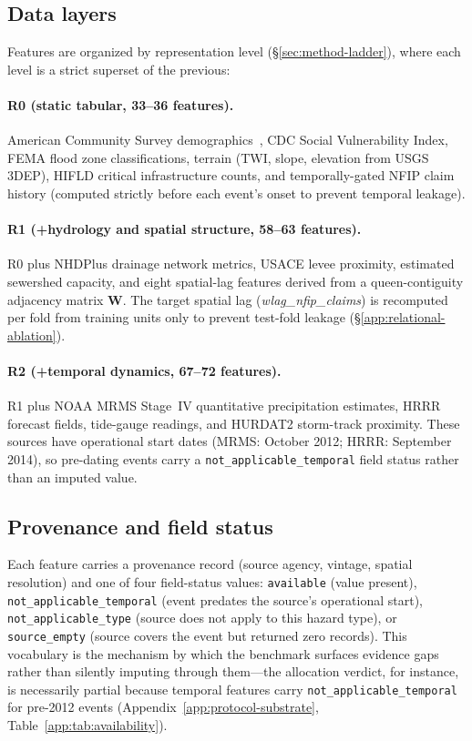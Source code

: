 \subsection{Data layers}

Features are organized by representation level
(\S\ref{sec:method-ladder}), where each level is a strict superset of
the previous:

\paragraph{R0 (static tabular, 33--36 features).}
American Community Survey demographics~\cite{kwon2023acs}, CDC Social
Vulnerability Index, FEMA flood zone classifications, terrain (TWI,
slope, elevation from USGS 3DEP), HIFLD critical infrastructure counts,
and temporally-gated NFIP claim history (computed strictly before each
event's onset to prevent temporal leakage).

\paragraph{R1 (+hydrology and spatial structure, 58--63 features).}
R0 plus NHDPlus drainage network metrics, USACE levee proximity, estimated
sewershed capacity, and eight spatial-lag features derived from a
queen-contiguity adjacency matrix $\mathbf{W}$. The target spatial lag
(\textit{wlag\_nfip\_claims}) is recomputed per fold from training units
only to prevent test-fold leakage (\S\ref{app:relational-ablation}).

\paragraph{R2 (+temporal dynamics, 67--72 features).}
R1 plus NOAA MRMS Stage~IV quantitative precipitation estimates, HRRR
forecast fields, tide-gauge readings, and HURDAT2 storm-track proximity.
These sources have operational start dates (MRMS: October 2012; HRRR:
September 2014), so pre-dating events carry a
\texttt{not\_applicable\_temporal} field status rather than an imputed
value.

\subsection{Provenance and field status}

Each feature carries a provenance record (source agency, vintage,
spatial resolution) and one of four field-status values:
\texttt{available} (value present), \texttt{not\_applicable\_temporal}
(event predates the source's operational start),
\texttt{not\_applicable\_type} (source does not apply to this hazard
type), or \texttt{source\_empty} (source covers the event but returned
zero records). This vocabulary is the mechanism by which the benchmark
surfaces evidence gaps rather than silently imputing through them---the
allocation verdict, for instance, is necessarily partial because
temporal features carry \texttt{not\_applicable\_temporal} for pre-2012
events (Appendix~\ref{app:protocol-substrate},
Table~\ref{app:tab:availability}).

